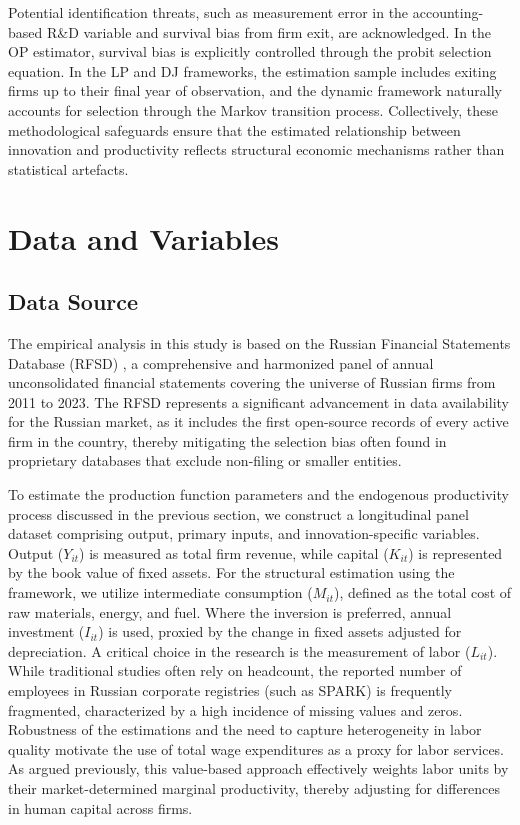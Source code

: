 \documentclass[a4paper, 12pt]{article}
\begin{document}
Potential identification threats, such as measurement error in the accounting-based R\&D variable and survival bias from firm exit, are acknowledged. In the OP estimator, survival bias is explicitly controlled through the probit selection equation. In the LP and DJ frameworks, the estimation sample includes exiting firms up to their final year of observation, and the dynamic framework naturally accounts for selection through the Markov transition process. Collectively, these methodological safeguards ensure that the estimated relationship between innovation and productivity reflects structural economic mechanisms rather than statistical artefacts.


\section{Data and Variables}

\subsection{Data Source}

The empirical analysis in this study is based on the Russian Financial Statements Database (RFSD) \parencite{bondarkov2025russian}, a comprehensive and harmonized panel of annual unconsolidated financial statements covering the universe of Russian firms from 2011 to 2023. The RFSD \parencite{bondarkov2025russian} represents a significant advancement in data availability for the Russian market, as it includes the first open-source records of every active firm in the country, thereby mitigating the selection bias often found in proprietary databases that exclude non-filing or smaller entities.

To estimate the production function parameters and the endogenous productivity process discussed in the previous section, we construct a longitudinal panel dataset comprising output, primary inputs, and innovation-specific variables. Output ($Y_{it}$) is measured as total firm revenue, while capital ($K_{it}$) is represented by the book value of fixed assets. For the structural estimation using the \textcite{levinsohn2003estimating} framework, we utilize intermediate consumption ($M_{it}$), defined as the total cost of raw materials, energy, and fuel. Where the \textcite{olley1992dynamics} inversion is preferred, annual investment ($I_{it}$) is used, proxied by the change in fixed assets adjusted for depreciation. A critical choice in the research is the measurement of labor ($L_{it}$). While traditional studies often rely on headcount, the reported number of employees in Russian corporate registries (such as SPARK) is frequently fragmented, characterized by a high incidence of missing values and zeros. Robustness of the estimations and the need to capture heterogeneity in labor quality motivate the use of total wage expenditures as a proxy for labor services. As argued previously, this value-based approach effectively weights labor units by their market-determined marginal productivity, thereby adjusting for differences in human capital across firms.
\end{document}
